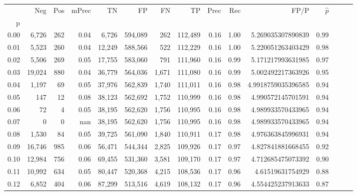 \begin{tabular}{rrrrrrrrrrrrrrr}
\toprule
{} &     Neg &     Pos & mPrec &       TN &       FP &       FN &       TP &  Prec &   Rec &                  FP/P & $\hat{p}$ \\
p    &         &         &       &          &          &          &          &       &       &                       &           \\
\midrule
0.00 &   6,726 &     262 &  0.04 &    6,726 &  594,089 &      262 &  112,489 &  0.16 &  1.00 &     5.269035307890839 &      0.99 \\
0.01 &   5,523 &     260 &  0.04 &   12,249 &  588,566 &      522 &  112,229 &  0.16 &  1.00 &     5.220051263403429 &      0.98 \\
0.02 &   5,506 &     269 &  0.05 &   17,755 &  583,060 &      791 &  111,960 &  0.16 &  0.99 &     5.171217993631985 &      0.97 \\
0.03 &  19,024 &     880 &  0.04 &   36,779 &  564,036 &    1,671 &  111,080 &  0.16 &  0.99 &     5.002492217363926 &      0.95 \\
0.04 &   1,197 &      69 &  0.05 &   37,976 &  562,839 &    1,740 &  111,011 &  0.16 &  0.98 &    4.9918759035396585 &      0.94 \\
0.05 &     147 &      12 &  0.08 &   38,123 &  562,692 &    1,752 &  110,999 &  0.16 &  0.98 &     4.990572145701591 &      0.94 \\
0.06 &      72 &       4 &  0.05 &   38,195 &  562,620 &    1,756 &  110,995 &  0.16 &  0.98 &     4.989933570433965 &      0.94 \\
0.07 &       0 &       0 &   nan &   38,195 &  562,620 &    1,756 &  110,995 &  0.16 &  0.98 &     4.989933570433965 &      0.94 \\
0.08 &   1,530 &      84 &  0.05 &   39,725 &  561,090 &    1,840 &  110,911 &  0.17 &  0.98 &     4.976363845996931 &      0.94 \\
0.09 &  16,746 &     985 &  0.06 &   56,471 &  544,344 &    2,825 &  109,926 &  0.17 &  0.97 &     4.827841881668455 &      0.92 \\
0.10 &  12,984 &     756 &  0.06 &   69,455 &  531,360 &    3,581 &  109,170 &  0.17 &  0.97 &     4.712685475073392 &      0.90 \\
0.11 &  10,992 &     634 &  0.05 &   80,447 &  520,368 &    4,215 &  108,536 &  0.17 &  0.96 &      4.61519631754929 &      0.88 \\
0.12 &   6,852 &     404 &  0.06 &   87,299 &  513,516 &    4,619 &  108,132 &  0.17 &  0.96 &     4.554425237913633 &      0.87 \\

\end{tabular}
